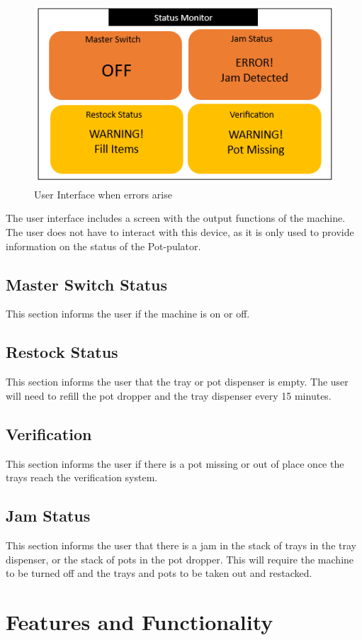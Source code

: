 \documentclass[12pt, titlepage]{article}
\begin{document}
  \begin{figure}[H]
    \centering
    \includegraphics{statusbad.png}
    \caption{User Interface when errors arise}
    \label{fig:scope}
  \end{figure}
The user interface includes a screen with the output functions of the machine. The user does not have to interact with this device, as it is only used to provide information on the status of the Pot-pulator.
\subsection{Master Switch Status}
This section informs the user if the machine is on or off.
\subsection{Restock Status}
This section informs the user that the tray or pot dispenser is empty. The user will need to refill the pot dropper and the tray dispenser every 15 minutes.
\subsection{Verification}
This section informs the user if there is a pot missing or out of place once the trays reach the verification system.
\subsection{Jam Status}
This section informs the user that there is a jam in the stack of trays in the tray dispenser, or the stack of pots in the pot dropper. This will require the machine to be turned off and the trays and pots to be taken out and restacked. 
\newpage
\section{Features and Functionality}
\end{document}
